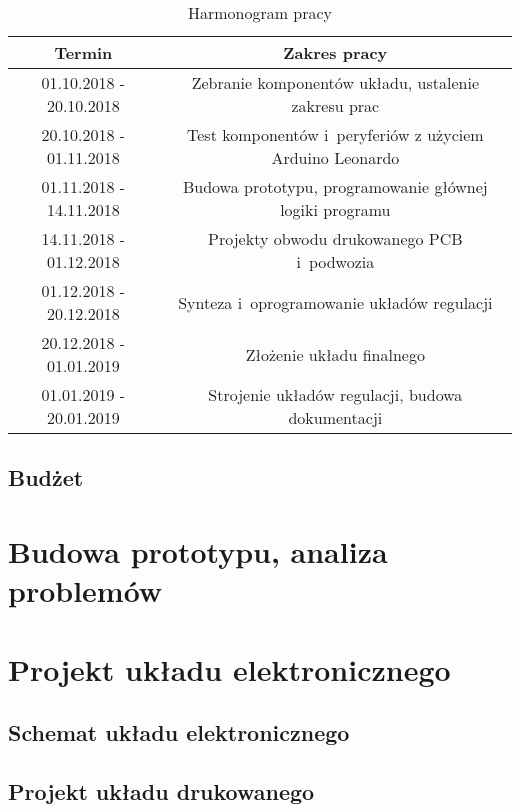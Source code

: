 \documentclass{article}
\begin{document}
\begin{table}[hbt]
	\centering
	\label{tab:schedule}
		\begin{tabular}{|c|c|}
	\hline
Termin                  & Zakres pracy                                                                         \\ \hline
01.10.2018 - 20.10.2018 & Zebranie komponentów układu, ustalenie zakresu prac                                  \\ \hline
20.10.2018 - 01.11.2018 & Test komponentów i~peryferiów z użyciem Arduino Leonardo                             \\ \hline
01.11.2018 - 14.11.2018 & Budowa prototypu, programowanie głównej logiki programu \\ \hline
14.11.2018 - 01.12.2018 & Projekty obwodu drukowanego PCB i~podwozia                                           \\ \hline
01.12.2018 - 20.12.2018 & Synteza i~oprogramowanie układów regulacji                                           \\ \hline
20.12.2018 - 01.01.2019 & Złożenie układu finalnego                                                            \\ \hline
01.01.2019 - 20.01.2019 & Strojenie układów regulacji, budowa dokumentacji                                      \\ \hline
\end{tabular}
	\caption{Harmonogram pracy}
\end{table}

\subsection{Budżet}

\section{Budowa prototypu, analiza problemów}

\section{Projekt układu elektronicznego}
\subsection{Schemat układu elektronicznego}
\subsection{Projekt układu drukowanego}
\end{document}
